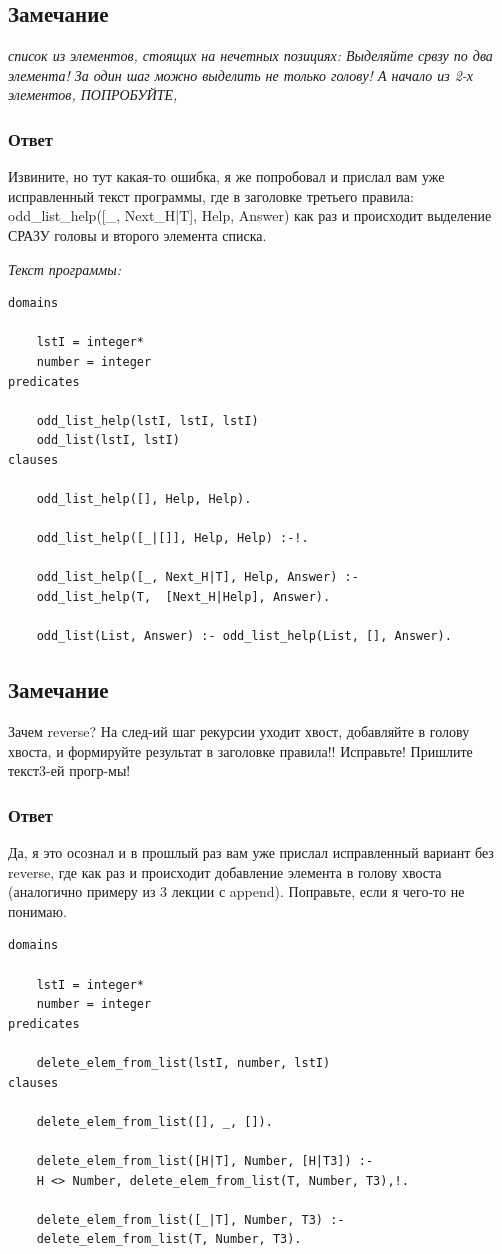\documentclass[a4paper,12pt]{article}
\begin{document}
	\subsection*{Замечание}
	
	\textit{список из элементов, стоящих на нечетных позициях: Выделяйте срвзу
		по два элемента! За один шаг можно выделить не только голову! А начало из 2-х элементов, ПОПРОБУЙТЕ,}
	
	\subsubsection*{Ответ}
	
	Извините, но тут какая-то ошибка, я же попробовал и прислал вам уже исправленный текст программы, где в заголовке третьего правила: odd\_list\_help([\_, Next\_H|T], Help, Answer) как раз и происходит выделение СРАЗУ головы и второго элемента списка.
	
	\textit{Текст программы:}
	
	\begin{verbatim}
domains
	
	lstI = integer*
	number = integer
predicates
	
	odd_list_help(lstI, lstI, lstI)
	odd_list(lstI, lstI)
clauses
	
	odd_list_help([], Help, Help).
	
	odd_list_help([_|[]], Help, Help) :-!.
	
	odd_list_help([_, Next_H|T], Help, Answer) :-
	odd_list_help(T,  [Next_H|Help], Answer).
	
	odd_list(List, Answer) :- odd_list_help(List, [], Answer).
	\end{verbatim}
	
	\subsection*{Замечание}
	
	Зачем reverse? На след-ий шаг рекурсии уходит хвост, добавляйте в голову хвоста, и формируйте результат в заголовке правила!! Исправьте! Пришлите текст3-ей прогр-мы!
	
	\subsubsection*{Ответ}
	
	Да, я это осознал и в прошлый раз вам уже прислал исправленный вариант без reverse, где как раз и происходит добавление элемента в голову хвоста (аналогично примеру из 3 лекции с append). Поправьте, если я чего-то не понимаю.
	
	\begin{verbatim}
domains

	lstI = integer*
	number = integer
predicates
	
	delete_elem_from_list(lstI, number, lstI)
clauses

	delete_elem_from_list([], _, []).
	
	delete_elem_from_list([H|T], Number, [H|T3]) :-
	H <> Number, delete_elem_from_list(T, Number, T3),!.
	
	delete_elem_from_list([_|T], Number, T3) :-
	delete_elem_from_list(T, Number, T3).
	\end{verbatim}
\end{document}
